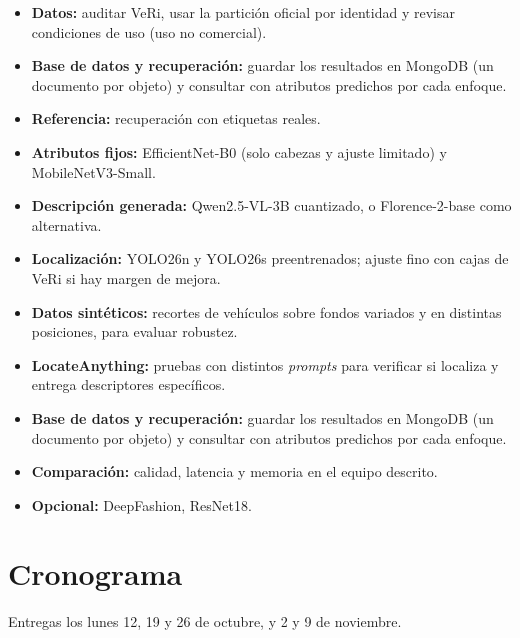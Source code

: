 \documentclass[11pt,a4paper]{article}
\begin{document}
\begin{itemize}[noitemsep]
  \item \textbf{Datos:} auditar VeRi, usar la partici\'on oficial por identidad y revisar condiciones de uso (uso no comercial).
  \item \textbf{Base de datos y recuperaci\'on:} guardar los resultados en MongoDB (un documento por objeto) y consultar con atributos predichos por cada enfoque.
  \item \textbf{Referencia:} recuperaci\'on con etiquetas reales.
  \item \textbf{Atributos fijos:} EfficientNet-B0 (solo cabezas y ajuste limitado) y MobileNetV3-Small.
  \item \textbf{Descripci\'on generada:} Qwen2.5-VL-3B cuantizado, o Florence-2-base como alternativa.
  \item \textbf{Localizaci\'on:} YOLO26n y YOLO26s preentrenados; ajuste fino con cajas de VeRi si hay margen de mejora.
  \item \textbf{Datos sint\'eticos:} recortes de veh\'iculos sobre fondos variados y en distintas posiciones, para evaluar robustez.
  \item \textbf{LocateAnything:} pruebas con distintos \emph{prompts} para verificar si localiza y entrega descriptores espec\'ificos.
  \item \textbf{Base de datos y recuperaci\'on:} guardar los resultados en MongoDB (un documento por objeto) y consultar con atributos predichos por cada enfoque.
  \item \textbf{Comparaci\'on:} calidad, latencia y memoria en el equipo descrito.
  \item \textbf{Opcional:} DeepFashion, ResNet18.
\end{itemize}

\newpage

\section{Cronograma}\label{sec:cronograma}

Entregas los lunes 12, 19 y 26 de octubre, y 2 y 9 de noviembre.
\end{document}
